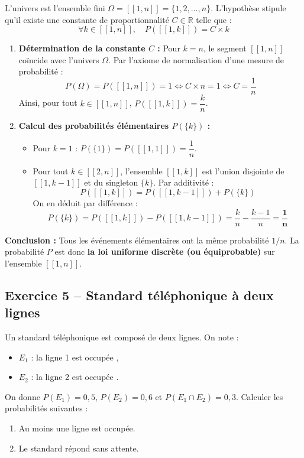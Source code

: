 \documentclass[11pt,a4paper]{article}
\newcommand{\R}{\mathbb{R}}
\begin{document}
\begin{correctionbox}
L'univers est l'ensemble fini $\Omega = [\![1, n]\!] = \{1, 2, \dots, n\}$.
L'hypothèse stipule qu'il existe une constante de proportionnalité $C \in \R$ telle que :
\[
\forall k \in [\![1, n]\!], \quad P([\![1, k]\!]) = C \times k
\]
\begin{enumerate}
    \item \textbf{Détermination de la constante $C$ :}
    Pour $k = n$, le segment $[\![1, n]\!]$ coïncide avec l'univers $\Omega$. Par l'axiome de normalisation d'une mesure de probabilité :
    \[
    P(\Omega) = P([\![1, n]\!]) = 1 \iff C \times n = 1 \iff C = \frac{1}{n}
    \]
    Ainsi, pour tout $k \in [\![1, n]\!]$, $P([\![1, k]\!]) = \dfrac{k}{n}$.

    \item \textbf{Calcul des probabilités élémentaires $P(\{k\})$ :}
    \begin{itemize}[label=$\bullet$]
        \item Pour $k = 1$ : $P(\{1\}) = P([\![1, 1]\!]) = \dfrac{1}{n}$.
        \item Pour tout $k \in [\![2, n]\!]$, l'ensemble $[\![1, k]\!]$ est l'union disjointe de $[\![1, k-1]\!]$ et du singleton $\{k\}$. Par additivité :
        \[
        P([\![1, k]\!]) = P([\![1, k-1]\!]) + P(\{k\})
        \]
        On en déduit par différence :
        \[
        P(\{k\}) = P([\![1, k]\!]) - P([\![1, k-1]\!]) = \frac{k}{n} - \frac{k-1}{n} = \mathbf{\frac{1}{n}}
        \]
    \end{itemize}
\end{enumerate}
\textbf{Conclusion :} Tous les événements élémentaires ont la même probabilité $1/n$. La probabilité $P$ est donc \textbf{la loi uniforme discrète (ou équiprobable)} sur l'ensemble $[\![1, n]\!]$.
\end{correctionbox}

\vspace{0.3cm}

\subsection*{Exercice 5 -- Standard téléphonique à deux lignes}

Un standard téléphonique est composé de deux lignes. On note :
\begin{itemize}[label=$\bullet$]
    \item $E_1$ : \og la ligne 1 est occupée \fg{},
    \item $E_2$ : \og la ligne 2 est occupée \fg{}.
\end{itemize}
On donne $P(E_1) = 0{,}5$, $P(E_2) = 0{,}6$ et $P(E_1 \cap E_2) = 0{,}3$.
Calculer les probabilités suivantes :
\begin{enumerate}[label=\arabic*.]
    \item Au moins une ligne est occupée.
    \item Le standard répond sans attente.
\end{enumerate}
\end{document}
